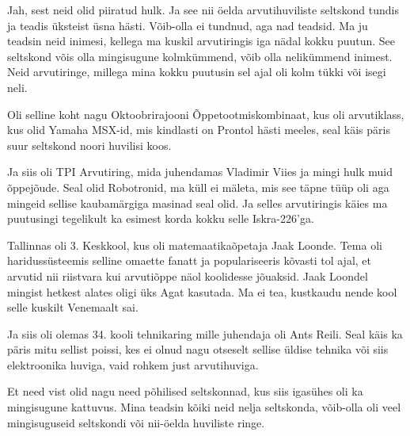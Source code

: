 
Jah, sest neid olid piiratud hulk. Ja see nii öelda arvutihuviliste seltskond 
tundis ja teadis üksteist üsna hästi. Võib-olla ei tundnud, aga nad teadsid. Ma 
ju teadsin neid inimesi, kellega ma kuskil arvutiringis iga nädal kokku puutun. 
See seltskond võis olla mingisugune kolmkümmend, võib olla nelikümmend inimest. 
Neid arvutiringe,  millega mina kokku puutusin sel ajal oli kolm tükki 
või isegi neli. 

Oli selline koht nagu Oktoobrirajooni Õppetootmiskombinaat, kus oli arvutiklass, kus  olid Yamaha 
MSX-id, mis kindlasti on Prontol 
hästi meeles, seal käis päris suur seltskond noori huvilisi koos. 

Ja siis oli TPI Arvutiring, mida juhendamas 
Vladimir Viies ja mingi hulk muid õppejõude. Seal 
olid Robotronid, ma küll ei mäleta, mis see täpne tüüp 
oli aga mingeid  sellise kaubamärgiga masinad seal olid. Ja selles arvutiringis 
käies ma puutusingi tegelikult ka esimest korda  kokku selle 
Iskra-226'ga.

Tallinnas oli  3. Keskkool, 
kus oli  matemaatikaõpetaja  Jaak Loonde. Tema oli haridussüsteemis selline omaette fanatt ja  populariseeris 
kõvasti tol ajal, et arvutid nii riistvara kui arvutiõppe näol koolidesse 
jõuaksid. Jaak Loondel  mingist hetkest alates oligi üks 
Agat kasutada. Ma ei tea, kustkaudu nende kool selle 
kuskilt Venemaalt sai. 

Ja siis oli olemas  34. kooli 
tehnikaring mille juhendaja oli Ants Reili. Seal käis ka 
päris mitu sellist poissi, kes ei olnud nagu otseselt sellise üldise tehnika 
või siis elektroonika huviga, vaid rohkem  just arvutihuviga.

Et need vist olid nagu need põhilised seltskonnad, kus siis igasühes oli  ka 
mingisugune kattuvus. Mina teadsin  kõiki neid nelja seltskonda, võib-olla oli 
veel mingisuguseid seltskondi või nii-öelda  huviliste ringe.


